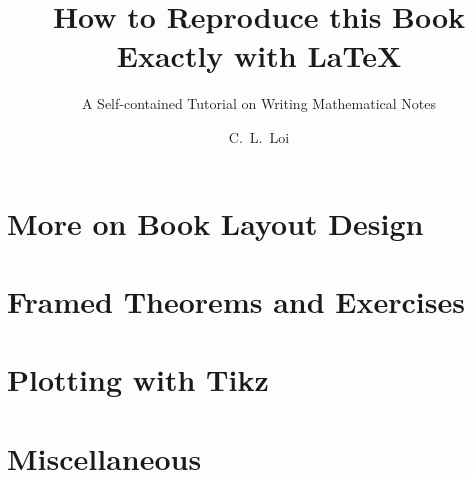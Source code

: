 \documentclass{scrbook}
\title{How to Reproduce this Book Exactly with \LaTeX}
\subtitle{A Self-contained Tutorial on Writing Mathematical Notes}
\author{C.~L.~Loi}
\begin{document}
\frontmatter
\maketitle
\tableofcontents
\mainmatter







\chapter{More on Book Layout Design}
\chapter{Framed Theorems and Exercises}
\chapter{Plotting with Tikz}
\chapter{Miscellaneous}
\end{document}
